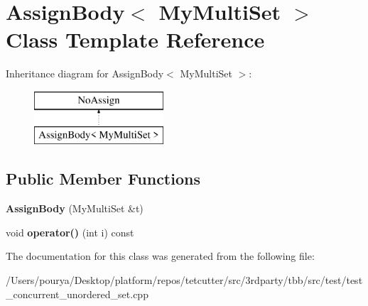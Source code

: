 \hypertarget{classAssignBody_3_01MyMultiSet_01_4}{}\section{Assign\+Body$<$ My\+Multi\+Set $>$ Class Template Reference}
\label{classAssignBody_3_01MyMultiSet_01_4}
Inheritance diagram for Assign\+Body$<$ My\+Multi\+Set $>$\+:\begin{figure}[H]
\begin{center}
\leavevmode
\includegraphics[height=2.000000cm]{classAssignBody_3_01MyMultiSet_01_4}
\end{center}
\end{figure}
\subsection*{Public Member Functions}
\begin{DoxyCompactItemize}
\item 
\hypertarget{classAssignBody_3_01MyMultiSet_01_4_a1a9a0fae359557d734426da19963ff11}{}{\bfseries Assign\+Body} (My\+Multi\+Set \&t)\label{classAssignBody_3_01MyMultiSet_01_4_a1a9a0fae359557d734426da19963ff11}

\item 
\hypertarget{classAssignBody_3_01MyMultiSet_01_4_a01240edc5da9f0ecbd806bca74a1b77a}{}void {\bfseries operator()} (int i) const \label{classAssignBody_3_01MyMultiSet_01_4_a01240edc5da9f0ecbd806bca74a1b77a}

\end{DoxyCompactItemize}


The documentation for this class was generated from the following file\+:\begin{DoxyCompactItemize}
\item 
/\+Users/pourya/\+Desktop/platform/repos/tetcutter/src/3rdparty/tbb/src/test/test\+\_\+concurrent\+\_\+unordered\+\_\+set.\+cpp\end{DoxyCompactItemize}
